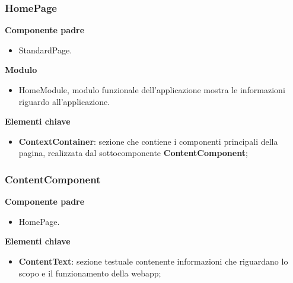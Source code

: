 \subsubsection{HomePage}
\textbf{Componente padre}
\begin{itemize}
    \item StandardPage.
\end{itemize}
\textbf{Modulo}
\begin{itemize}
    \item HomeModule, modulo funzionale dell'applicazione mostra le informazioni riguardo all'applicazione.
\end{itemize}
\textbf{Elementi chiave}
\begin{itemize}
    \item \textbf{ContextContainer}: sezione che contiene i componenti principali della pagina, realizzata dal sottocomponente \textbf{ContentComponent};
\end{itemize}
\subsubsection{ContentComponent}
\textbf{Componente padre}
\begin{itemize}
    \item HomePage.
\end{itemize}
\textbf{Elementi chiave}
\begin{itemize}
    \item \textbf{ContentText}: sezione testuale contenente informazioni che riguardano lo scopo e il funzionamento della webapp;
\end{itemize}
